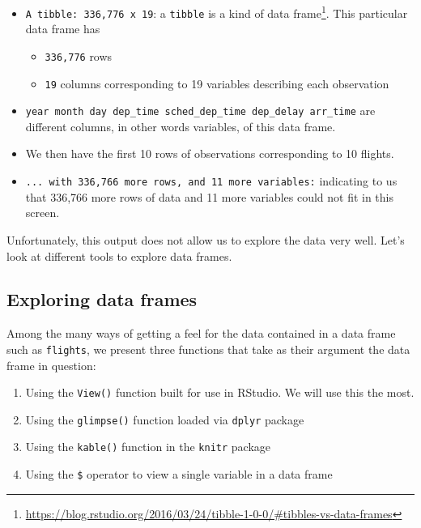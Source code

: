 \documentclass[12pt,]{krantz}
\providecommand{\tightlist}{%
  \setlength{\itemsep}{0pt}\setlength{\parskip}{0pt}}
\renewcommand{\href}[2]{#2\footnote{\url{#1}}}
\theoremstyle{definition}
\theoremstyle{definition}
\theoremstyle{definition}
\theoremstyle{remark}
\begin{document}
\begin{itemize}
\tightlist
\item
  \texttt{A\ tibble:\ 336,776\ x\ 19}: a \texttt{tibble} is a
  \href{https://blog.rstudio.org/2016/03/24/tibble-1-0-0/\#tibbles-vs-data-frames}{kind
  of data frame}. This particular data frame has

  \begin{itemize}
  \tightlist
  \item
    \texttt{336,776} rows
  \item
    \texttt{19} columns corresponding to 19 variables describing each
    observation
  \end{itemize}
\item
  \texttt{year\ month\ day\ dep\_time\ sched\_dep\_time\ dep\_delay\ arr\_time}
  are different columns, in other words variables, of this data frame.
\item
  We then have the first 10 rows of observations corresponding to 10
  flights.
\item
  \texttt{...\ with\ 336,766\ more\ rows,\ and\ 11\ more\ variables:}
  indicating to us that 336,766 more rows of data and 11 more variables
  could not fit in this screen.
\end{itemize}

Unfortunately, this output does not allow us to explore the data very
well. Let's look at different tools to explore data frames.

\subsection{Exploring data frames}\label{exploredataframes}

Among the many ways of getting a feel for the data contained in a data
frame such as \texttt{flights}, we present three functions that take as
their argument the data frame in question:

\begin{enumerate}
\def\labelenumi{\arabic{enumi}.}
\tightlist
\item
  Using the \texttt{View()} function built for use in RStudio. We will
  use this the most.
\item
  Using the \texttt{glimpse()} function loaded via \texttt{dplyr}
  package
\item
  Using the \texttt{kable()} function in the \texttt{knitr} package
\item
  Using the \texttt{\$} operator to view a single variable in a data
  frame
\end{enumerate}
\end{document}
